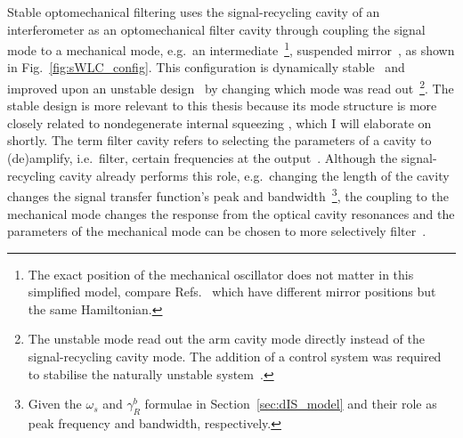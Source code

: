 Stable optomechanical filtering uses the signal-recycling cavity of an interferometer as an optomechanical filter cavity through coupling the signal mode to a mechanical mode, e.g.\ an intermediate~\footnote{The exact position of the mechanical oscillator does not matter in this simplified model, compare Refs.~\cite{Li2020,Li2021} which have different mirror positions but the same Hamiltonian.}, suspended mirror~\cite{}, as shown in Fig.~\ref{fig:sWLC_config}. 
This configuration is dynamically stable~\cite{} and improved upon an unstable design~\cite{} by changing which mode was read out~\footnote{The unstable mode read out the arm cavity mode directly instead of the signal-recycling cavity mode. The addition of a control system was required to stabilise the naturally unstable system~\cite{}.}. The stable design is more relevant to this thesis because its mode structure is more closely related to nondegenerate internal squeezing , which I will elaborate on shortly.
The term filter cavity refers to selecting the parameters of a cavity to (de)amplify, i.e.\ filter, certain frequencies at the output~\cite{}. Although the signal-recycling cavity already performs this role, e.g.\ changing the length of the cavity changes the signal transfer function's peak and bandwidth~\footnote{Given the $\omega_s$ and $\gamma^b_R$ formulae in Section~\ref{sec:dIS_model} and their role as peak frequency and bandwidth, respectively.}, the coupling to the mechanical mode changes the response from the optical cavity resonances and the parameters of the mechanical mode can be chosen to more selectively filter~\cite{}. %
